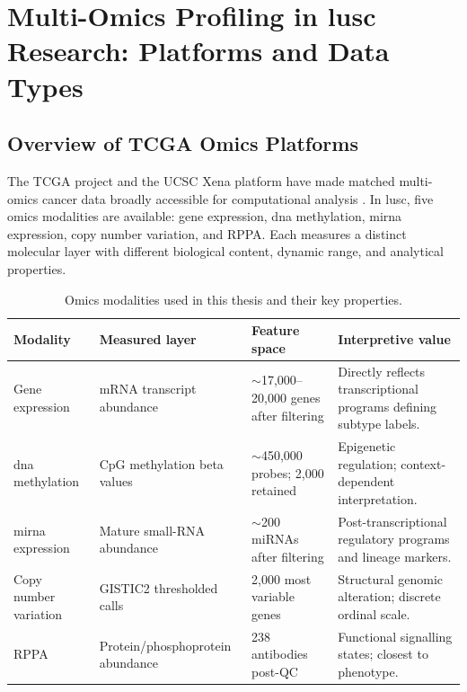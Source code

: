 \section{Multi-Omics Profiling in \gls{lusc} Research: Platforms and Data Types}


\subsection{Overview of TCGA Omics Platforms}

The TCGA project and the UCSC Xena platform have made matched multi-omics cancer data broadly accessible for computational analysis \parencite{Goldman2020}. In \gls{lusc}, five omics modalities are available: gene expression, \gls{dna} methylation, \gls{mirna} expression, copy number variation, and RPPA. Each measures a distinct molecular layer with different biological content, dynamic range, and analytical properties.


\begin{table}[ht]
\small
\caption[Omics modalities used for LUSC subtype classification]{Omics
modalities used in this thesis and their key properties.}
\centering
\begin{tabular}{p{2.5cm}p{3.0cm}p{3.0cm}p{4.2cm}}
\toprule
\textbf{Modality} & \textbf{Measured layer} & \textbf{Feature space}
    & \textbf{Interpretive value} \\
\midrule
Gene expression & mRNA transcript abundance
    & $\sim$17{,}000--20{,}000 genes after filtering
    & Directly reflects transcriptional programs defining subtype labels. \\[3pt]
\gls{dna} methylation & CpG methylation beta values
    & $\sim$450{,}000 probes; 2{,}000 retained
    & Epigenetic regulation; context-dependent interpretation. \\[3pt]
\gls{mirna} expression & Mature small-RNA abundance
    & $\sim$200 miRNAs after filtering
    & Post-transcriptional regulatory programs and lineage markers. \\[3pt]
Copy number variation & GISTIC2 thresholded calls
    & 2{,}000 most variable genes
    & Structural genomic alteration; discrete ordinal scale. \\[3pt]
RPPA & Protein/phosphoprotein abundance
    & 238 antibodies post-QC
    & Functional signalling states; closest to phenotype. \\
\bottomrule
\end{tabular}
\label{tab:omics_layers_lit_review}
\end{table}


